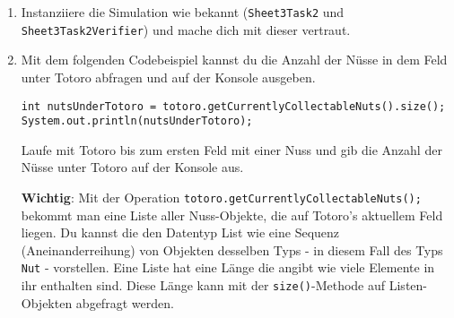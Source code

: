 
\begin{enumerate}
	\item
	Instanziiere die Simulation wie bekannt (\lstinline{Sheet3Task2} und \lstinline{Sheet3Task2Verifier}) und mache dich mit dieser vertraut.

	\item
		Mit dem folgenden Codebeispiel kannst du die Anzahl der Nüsse in dem Feld unter Totoro abfragen und auf der Konsole ausgeben.

		\begin{lstlisting}
int nutsUnderTotoro = totoro.getCurrentlyCollectableNuts().size();
System.out.println(nutsUnderTotoro);
		\end{lstlisting}

		Laufe mit Totoro bis zum ersten Feld mit einer Nuss und gib die Anzahl der Nüsse unter Totoro auf der Konsole aus.\newline

		\textbf{Wichtig}: Mit der Operation \lstinline{totoro.getCurrentlyCollectableNuts();} bekommt man eine Liste aller Nuss-Objekte, die auf Totoro's aktuellem Feld liegen.
		Du kannst die den Datentyp List wie eine Sequenz (Aneinanderreihung) von Objekten desselben Typs - in diesem Fall des Typs \lstinline{Nut} - vorstellen.
		Eine Liste hat eine Länge die angibt wie viele Elemente in ihr enthalten sind.
		Diese Länge kann mit der \lstinline{size()}-Methode auf Listen-Objekten abgefragt werden.
\end{enumerate}


